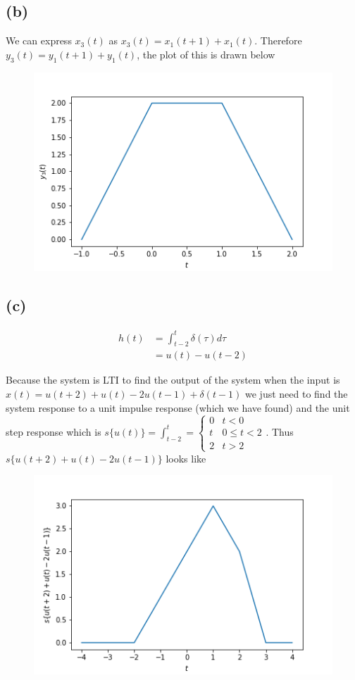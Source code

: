 \documentclass[12pt]{article}
\begin{document}
\subsection*{(b)}
We can express $x_3(t)$ as $x_3(t)=x_1(t+1)+x_1(t)$. Therefore $y_3(t)=y_1(t+1)+y_1(t)$, the plot of this is drawn below
\begin{figure}[h]
\includegraphics[scale=0.3]{fig3b}
\centering
\end{figure}
\subsection*{(c)}
\begin{align*}
h(t)&=\int_{t-2}^{t}\delta(\tau)d\tau\\
&=\boxed{u(t)-u(t-2)}
\end{align*}

Because the system is LTI to find the output of the system when the input is $x(t)=u(t+2)+u(t)-2u(t-1)+\delta(t-1)$ we just need to find the system response to a unit impulse response (which we have found) and the unit step response which is $s\{u(t)\}=\int_{t-2}^{t}=\begin{cases}
0 & t<0\\
t & 0\leq t<2\\
2 & t>2
\end{cases}$. Thus $s\{u(t+2)+u(t)-2u(t-1)\}$ looks like
\begin{figure}[h!]
\includegraphics[scale=0.3]{fig3c}
\centering
\end{figure}
\pagebreak
\end{document}

